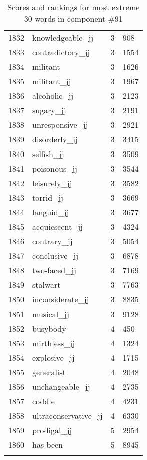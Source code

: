 \begin{longtable}[!htbp]{| rlr@{.}l |}
    1832 & knowledgeable\_jj & 3 & 908 \\
    1833 & contradictory\_jj & 3 & 1554 \\
    1834 & militant & 3 & 1626 \\
    1835 & militant\_jj & 3 & 1967 \\
    1836 & alcoholic\_jj & 3 & 2123 \\
    1837 & sugary\_jj & 3 & 2191 \\
    1838 & unresponsive\_jj & 3 & 2921 \\
    1839 & disorderly\_jj & 3 & 3415 \\
    1840 & selfish\_jj & 3 & 3509 \\
    1841 & poisonous\_jj & 3 & 3544 \\
    1842 & leisurely\_jj & 3 & 3582 \\
    1843 & torrid\_jj & 3 & 3669 \\
    1844 & languid\_jj & 3 & 3677 \\
    1845 & acquiescent\_jj & 3 & 4324 \\
    1846 & contrary\_jj & 3 & 5054 \\
    1847 & conclusive\_jj & 3 & 6878 \\
    1848 & two-faced\_jj & 3 & 7169 \\
    1849 & stalwart & 3 & 7763 \\
    1850 & inconsiderate\_jj & 3 & 8835 \\
    1851 & musical\_jj & 3 & 9128 \\
    1852 & busybody & 4 & 450 \\
    1853 & mirthless\_jj & 4 & 1324 \\
    1854 & explosive\_jj & 4 & 1715 \\
    1855 & generalist & 4 & 2048 \\
    1856 & unchangeable\_jj & 4 & 2735 \\
    1857 & coddle & 4 & 4231 \\
    1858 & ultraconservative\_jj & 4 & 6330 \\
    1859 & prodigal\_jj & 5 & 2954 \\
    1860 & has-been & 5 & 8945 \\
    \hline
    \caption{Scores and rankings for most extreme 30 words in component \#91} \\
\end{longtable}

